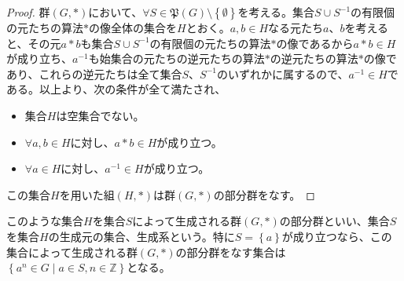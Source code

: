 \documentclass[dvipdfmx]{jsarticle}
\begin{document}
\begin{proof}
群$(G,*)$において、$\forall S \in \mathfrak{P}(G) \setminus \left\{ \emptyset  \right\}$を考える。集合$S \cup S^{- 1}$の有限個の元たちの算法$*$の像全体の集合を$H$とおく。$a,b \in H$なる元たち$a$、$b$を考えると、その元$a*b$も集合$S \cup S^{- 1}$の有限個の元たちの算法$*$の像であるから$a*b \in H$が成り立ち、$a^{- 1}$も始集合の元たちの逆元たちの算法$*$の逆元たちの算法$*$の像であり、これらの逆元たちは全て集合$S$、$S^{- 1}$のいずれかに属するので、$a^{- 1} \in H$である。以上より、次の条件が全て満たされ、
\begin{itemize}
\item
  集合$H$は空集合でない。
\item
  $\forall a,b \in H$に対し、$a*b \in H$が成り立つ。
\item
  $\forall a \in H$に対し、$a^{- 1} \in H$が成り立つ。
\end{itemize}
この集合$H$を用いた組$(H,*)$は群$(G,*)$の部分群をなす。
\end{proof}
\begin{dfn}
このような集合$H$を集合$S$によって生成される群$(G,*)$の部分群といい、集合$S$を集合$H$の生成元の集合、生成系という。特に$S = \left\{ a \right\}$が成り立つなら、この集合によって生成される群$(G,*)$の部分群をなす集合は$\left\{ a^{n} \in G \middle| a \in S,n \in \mathbb{Z} \right\}$となる。
\end{dfn}
\end{document}
